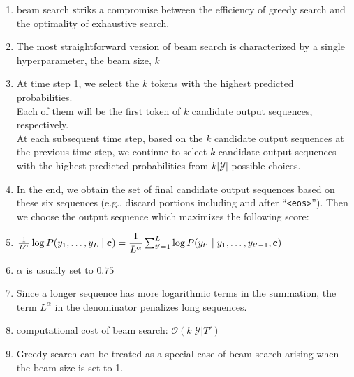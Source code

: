 \begin{enumerate}
    \item beam search striks a compromise between the efficiency of greedy search and the optimality of exhaustive search.

    \item The most straightforward version of beam search is characterized by a single hyperparameter, the beam size, $k$

    \item At time step 1, we select the $k$ tokens with the highest predicted probabilities.\\
    Each of them will be the first token of $k$ candidate output sequences, respectively.\\
    At each subsequent time step, based on the $k$ candidate output sequences at the previous time step, we continue to select $k$ candidate output sequences with the highest predicted probabilities from $k\left|\mathcal{Y}\right|$ possible choices.

    \item In the end, we obtain the set of final candidate output sequences based on these six sequences (e.g., discard portions including and after “\verb|<eos>|”). Then we choose the output sequence which maximizes the following score:
    
    \item[] $
        \hfill
        \frac{1}{L^\alpha} \log P(y_1, \ldots, y_{L}\mid \mathbf{c}) = \dfrac{1}{L^\alpha} \sum_{t'=1}^L \log P(y_{t'} \mid y_1, \ldots, y_{t'-1}, \mathbf{c})
        \hfill
    $
    
    \item $\alpha$ is usually set to $0.75$

    \item Since a longer sequence has more logarithmic terms in the summation, the term $L^\alpha$ in the denominator penalizes long sequences.

    \item computational cost of beam search: $\mathcal{O}(k\left|\mathcal{Y}\right|T')$

    \item Greedy search can be treated as a special case of beam search arising when the beam size is set to 1.

\end{enumerate}





























